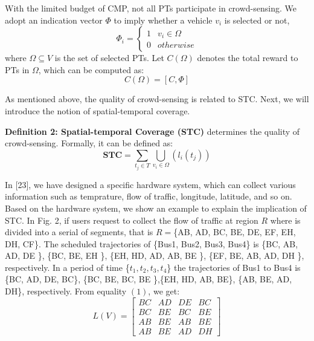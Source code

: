 \documentclass[journal]{IEEEtran}
\begin{document}
With the limited budget of CMP, not all PTs participate in crowd-sensing. We adopt an indication vector $\Phi $ to imply whether a vehicle $v_{i}$ is selected or not,
\begin{equation}
\Phi_{i}= \left\{\begin{matrix}
1&v_{i}\in \Omega \\ 
0&otherwise\end{matrix}\right.
\end{equation}
where $\Omega \subseteq V$ is the set of selected PTs. Let $C(\Omega)$ denotes the total reward to PTs in $\Omega$, which can be computed as:
\begin{equation}
C(\Omega )=\left [ C,\Phi  \right ]
\end{equation}

As mentioned above, the quality of crowd-sensing is related to STC. Next, we will introduce the notion of spatial-temporal coverage.

\noindent
\textbf{Definition 2: Spatial-temporal Coverage (STC)} determines the quality of crowd-sensing. Formally, it can be defined as:
\begin{equation}
\textbf{STC}=\sum_{t_{j}\in T}\bigcup_{v_{i}\in \Omega}\left (l_{i}(t_{j}) \right)
\end{equation}

 In [23], we have designed a specific hardware system, which can collect various information such as temprature, flow of traffic, longitude, latitude, and so on. Based on the hardware system, we show an example to explain the implication of STC. In Fig. 2, if users request to collect the flow of traffic at region $R$ where is divided into a serial of segments, that is $R=$\{AB, AD, BC, BE, DE, EF, EH, DH, CF\}. The scheduled trajectories of \{Bus1, Bus2, Bus3, Bus4\} is \{BC, AB, AD, DE \}, \{BC, BE, EH \}, \{EH, HD, AD, AB, BE \}, \{EF, BE, AB, AD, DH \}, respectively. In a period of time \{$t_{1},t_{2},t_{3},t_{4}$\}  the trajectories of  Bus1 to Bus4 is \{BC, AD, DE, BC\}, \{BC, BE, BC, BE \},\{EH, HD, AB, BE\}, \{AB, BE, AD, DH\}, respectively. From equality $(1)$, we get:
\begin{equation}
L(V)=\begin{bmatrix}
BC &AD &DE &BC \\ 
BC& BE &BC &BE\\ 
AB& BE &AB &BE\\ 
AB& BE &AD &DH
\end{bmatrix}
\end{equation}
\end{document}
